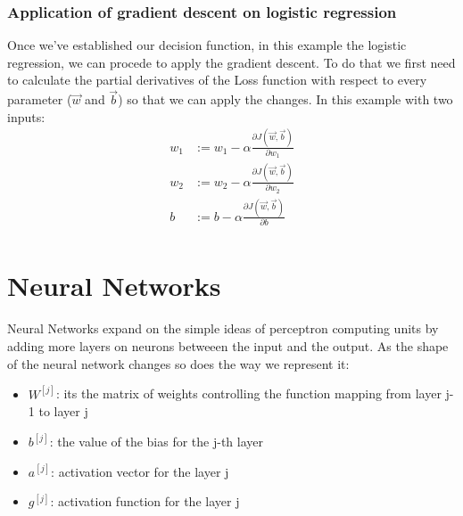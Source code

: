 \documentclass{article}
\begin{document}
\subsubsection*{Application of gradient descent on logistic regression}
Once we've established our decision function, in this example the logistic regression, we can procede to apply the gradient descent. To do that we first need to calculate the partial derivatives of the Loss function with respect to every parameter ($\vec{w}$ and $\vec{b}$) so that we can apply the changes. In this example with two inputs:
\begin{align*}
    w_1 &:= w_1 - \alpha \frac{\partial J(\vec{w},\vec{b})}{\partial w_1}\\
    w_2 &:= w_2 - \alpha \frac{\partial J(\vec{w},\vec{b})}{\partial w_2}\\
    b &:= b - \alpha \frac{\partial J(\vec{w},\vec{b})}{\partial b}\\
\end{align*}

\section*{Neural Networks}
Neural Networks expand on the simple ideas of perceptron computing units by adding more layers on neurons betweeen the input and the output. As the shape of the neural network changes so does the way we represent it:
\begin{itemize}
    \item $W^{[j]}$: its the matrix of weights controlling the function mapping from layer j-1 to layer j
    \item $b^{[j]}$: the value of the bias for the j-th layer
    \item $a^{[j]}$: activation vector for the layer j
    \item $g^{[j]}$: activation function for the layer j
\end{itemize}
\end{document}
